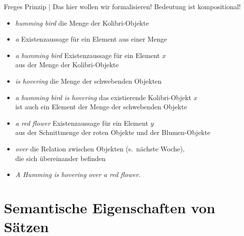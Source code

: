 \begin{frame}
  {Freges Prinzip | Das hier wollen wir formalisieren!}
  \onslide<+->
  \onslide<+->
  Bedeutung ist kompositional!\\
  \Halbzeile
  \begin{itemize}[<+->]\small
    \item \textit{humming bird}  die \alert{Menge} der Kolibri-Objekte
    \item \textit{a}  \alert{Existenzaussage} für ein Element aus einer Menge
    \item \textit{a humming bird}  \alert{Existenzaussage} für ein Element $x$\\
      aus der Menge der Kolibri-Objekte
    \item \textit{is hovering}  die \alert{Menge} der schwebenden Objekten
    \item \textit{a humming bird is hovering}  das existierende Kolibri-Objekt $x$\\
      ist auch ein \alert{Element der Menge} der schwebenden Objekte
    \item \textit{a red flower}  \alert{Existenzaussage} für ein Element $y$\\
      aus der \alert{Schnittmenge} der roten Objekte und der Blumen-Objekte
    \item \textit{over}  die \alert{Relation} zwischen Objekten (s.\ nächste Woche),\\
      die sich übereinander befinden
    \item \textit{A Humming is hovering over a red flower.} \\
  \end{itemize}
\end{frame}

\section{Semantische Eigenschaften von Sätzen}

